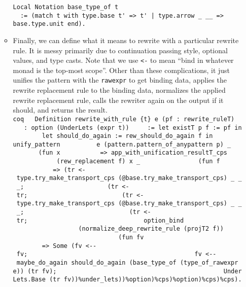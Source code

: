 \documentclass[
]{article}
\begin{document}
\begin{itemize}
\begin{itemize}
\begin{verbatim}
Local Notation base_type_of t
  := (match t with type.base t' => t' | type.arrow _ __ => base.type.unit end).
\end{verbatim}
  \item
    Finally, we can define what it means to rewrite with a particular
    rewrite rule. It is messy primarily due to continuation passing
    style, optional values, and type casts. Note that we use
    \texttt{\textless{}-} to mean ``bind in whatever monad is the
    top-most scope''. Other than these complications, it just unifies
    the pattern with the \texttt{rawexpr} to get binding data, applies
    the rewrite replacement rule to the binding data, normalizes the
    applied rewrite replacement rule, calls the rewriter again on the
    output if it should, and returns the result.
    \texttt{coq\ \ \ Definition\ rewrite\_with\_rule\ \{t\}\ e\textquotesingle{}\ (pf\ :\ rewrite\_ruleT)\ \ \ ~\ :\ option\ (UnderLets\ (expr\ t))\ \ \ ~\ :=\ let\ \textquotesingle{}existT\ p\ f\ :=\ pf\ in\ \ \ ~\ ~\ ~let\ should\_do\_again\ :=\ rew\_should\_do\_again\ f\ in\ \ \ ~\ ~\ ~unify\_pattern\ \ \ ~\ ~\ ~\ ~e\textquotesingle{}\ (pattern.pattern\_of\_anypattern\ p)\ \_\ \ \ ~\ ~\ ~\ ~(fun\ x\ \ \ ~\ ~\ ~\ ~\ =\textgreater{}\ app\_with\_unification\_resultT\_cps\ \ \ ~\ ~\ ~\ ~\ ~\ ~\ ~(rew\_replacement\ f)\ x\ \_\ \ \ ~\ ~\ ~\ ~\ ~\ ~\ ~(fun\ f\textquotesingle{}\ \ \ ~\ ~\ ~\ ~\ ~\ ~\ ~\ =\textgreater{}\ (tr\ \textless{}-\ type.try\_make\_transport\_cps\ (@base.try\_make\_transport\_cps)\ \_\ \_\ \_;\ \ \ ~\ ~\ ~\ ~\ ~\ ~\ ~\ ~\ ~\ ~\ (tr\ \textless{}-\ tr;\ \ \ ~\ ~\ ~\ ~\ ~\ ~\ ~\ ~\ ~\ ~\ ~\ ~(tr\textquotesingle{}\ \textless{}-\ type.try\_make\_transport\_cps\ (@base.try\_make\_transport\_cps)\ \_\ \_\ \_;\ \ \ ~\ ~\ ~\ ~\ ~\ ~\ ~\ ~\ ~\ ~\ ~\ ~\ ~\ (tr\textquotesingle{}\ \textless{}-\ tr\textquotesingle{};\ \ \ ~\ ~\ ~\ ~\ ~\ ~\ ~\ ~\ ~\ ~\ ~\ ~\ ~\ ~\ ~option\_bind\textquotesingle{}\ \ \ ~\ ~\ ~\ ~\ ~\ ~\ ~\ ~\ ~\ ~\ ~\ ~\ ~\ ~\ ~\ ~(normalize\_deep\_rewrite\_rule\ (projT2\ f\textquotesingle{}))\ \ \ ~\ ~\ ~\ ~\ ~\ ~\ ~\ ~\ ~\ ~\ ~\ ~\ ~\ ~\ ~\ ~(fun\ fv\ \ \ ~\ ~\ ~\ ~\ ~\ ~\ ~\ ~\ ~\ ~\ ~\ ~\ ~\ ~\ ~\ ~\ =\textgreater{}\ Some\ (fv\ \textless{}-\/-\ fv;\ \ \ ~\ ~\ ~\ ~\ ~\ ~\ ~\ ~\ ~\ ~\ ~\ ~\ ~\ ~\ ~\ ~\ ~\ ~\ ~\ ~\ ~\ ~fv\ \textless{}-\/-\ maybe\_do\_again\ should\_do\_again\ (base\_type\_of\ (type\_of\_rawexpr\ e\textquotesingle{}))\ (tr\ fv);\ \ \ ~\ ~\ ~\ ~\ ~\ ~\ ~\ ~\ ~\ ~\ ~\ ~\ ~\ ~\ ~\ ~\ ~\ ~\ ~\ ~\ ~\ ~UnderLets.Base\ (tr\textquotesingle{}\ fv))\%under\_lets))\%option)\%cps)\%option)\%cps)\%cps).}


\end{itemize}
\end{itemize}
\end{document}
